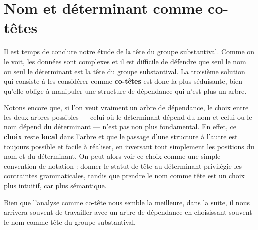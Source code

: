\section{Nom et déterminant comme co-têtes}\label{sec:3.3.27}

Il est temps de conclure notre étude de la tête du groupe substantival. Comme on le voit, les données sont complexes et il est difficile de défendre que seul le nom ou seul le déterminant est la tête du groupe substantival. La troisième solution qui consiste à les considérer comme \textbf{co-têtes} est donc la plus séduisante, bien qu’elle oblige à manipuler une structure de dépendance qui n’est plus un arbre.

Notons encore que, si l’on veut vraiment un arbre de dépendance, le choix entre les deux arbres possibles — celui où le déterminant dépend du nom et celui ou le nom dépend du déterminant — n’est pas non plus fondamental. En effet, ce \textbf{choix} reste \textbf{local} dans l’arbre et que le passage d’une structure à l’autre est toujours possible et facile à réaliser, en inversant tout simplement les positions du nom et du déterminant. On peut alors voir ce choix comme une simple convention de notation : donner le statut de tête au déterminant privilégie les contraintes grammaticales, tandis que prendre le nom comme tête est un choix plus intuitif, car plus sémantique.

Bien que l’analyse comme co-tête nous semble la meilleure, dans la suite, il nous arrivera souvent de travailler avec un arbre de dépendance en choisissant souvent le nom comme tête du groupe substantival.

